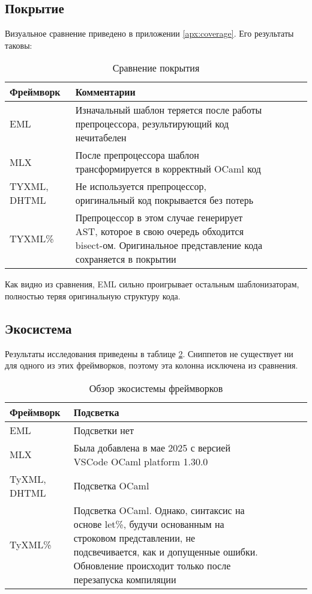 \subsection{Покрытие}

Визуальное сравнение приведено в приложении \ref{apx:coverage}.
Его результаты таковы:

\begin{table}[h]
    \centering
    \caption{Сравнение покрытия}
    \label{tab:coverage-comparison}
    \begin{tabularx}{\linewidth}{l>{\raggedright\arraybackslash}X>{\raggedright\arraybackslash}XcXX}
        \toprule
        \textbf{Фреймворк} & \textbf{Комментарии} \\
        \midrule
        EML & \cellcolor{yellow!30} Изначальный шаблон теряется после работы препроцессора, результирующий код нечитабелен \\
        MLX & После препроцессора шаблон трансформируется в корректный OCaml код \\
        TYXML, DHTML & Не используется препроцессор, оригинальный код покрывается без потерь \\
        TYXML\% & Препроцессор в этом случае генерирует AST, которое в свою очередь обходится bisect-ом. Оригинальное представление кода сохраняется в покрытии \\
        \bottomrule
    \end{tabularx}
\end{table}

Как видно из сравнения, EML сильно проигрывает остальным шаблонизаторам, полностью теряя оригинальную структуру кода.

\subsection{Экосистема}

Результаты исследования приведены в таблице \ref{tab:ecosystem}.
Сниппетов не существует ни для одного из этих фреймворков, поэтому эта колонна исключена из сравнения.

\begin{table}[h!]
    \begin{tabularx}{\linewidth}{l>{\raggedright\arraybackslash}X>{\raggedright\arraybackslash}XcXX}
        \toprule
        \textbf{Фреймворк} & \textbf{Подсветка} \\
        \midrule
        EML & \cellcolor{yellow!30} Подсветки нет \\
        MLX & Была добавлена в мае 2025 с версией VSCode OCaml platform 1.30.0 \\
        TyXML, DHTML & Подсветка OCaml \\
        TyXML\% & Подсветка OCaml. Однако, синтаксис на основе let\%, будучи основанным на строковом представлении, не подсвечивается, как и допущенные ошибки. Обновление происходит только после перезапуска компиляции \\
        \bottomrule
    \end{tabularx}
    \caption{Обзор экосистемы фреймворков}
    \label{tab:ecosystem}
\end{table}

